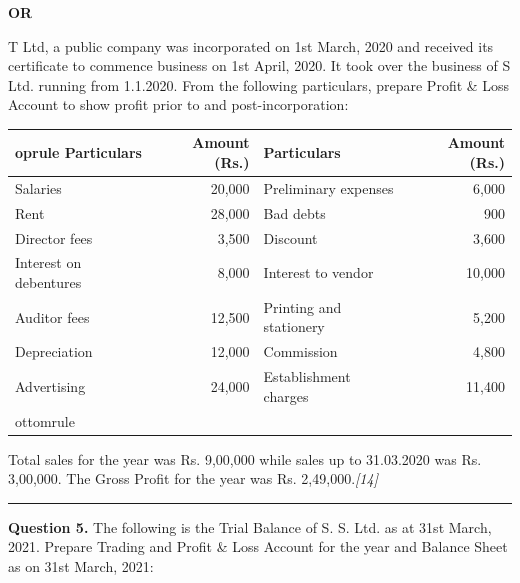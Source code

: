 \documentclass[11pt,a4paper]{article}
\newcommand{\pts}[1]{\hfill   \textit{[#1]}}
\begin{document}
\centerline{   \textbf{OR}}

T Ltd, a public company was incorporated on 1st March, 2020 and received its certificate to commence business on 1st April, 2020. It took over the business of S Ltd. running from 1.1.2020. From the following particulars, prepare Profit \& Loss Account to show profit prior to and post-incorporation:

\begin{center}
  \small
  
\begin{tabular}{lr|lr}
     oprule
   \textbf{Particulars} &   \textbf{Amount (Rs.)} &   \textbf{Particulars} &   \textbf{Amount (Rs.)} \\
    \midrule
    Salaries & 20,000 & Preliminary expenses & 6,000 \\
    Rent & 28,000 & Bad debts & 900 \\
    Director fees & 3,500 & Discount & 3,600 \\
    Interest on debentures & 8,000 & Interest to vendor & 10,000 \\
    Auditor fees & 12,500 & Printing and stationery & 5,200 \\
    Depreciation & 12,000 & Commission & 4,800 \\
    Advertising & 24,000 & Establishment charges & 11,400 \\
    ottomrule
  \end{tabular}
\end{center}
Total sales for the year was Rs. 9,00,000 while sales up to 31.03.2020 was Rs. 3,00,000. The Gross Profit for the year was Rs. 2,49,000.\pts{14}

\medskip\rule{\linewidth}{0.2pt}


\newpage




\noindent   \textbf{Question 5.}
The following is the Trial Balance of S. S. Ltd. as at 31st March, 2021. Prepare Trading and Profit \& Loss Account for the year and Balance Sheet as on 31st March, 2021:
\end{document}
